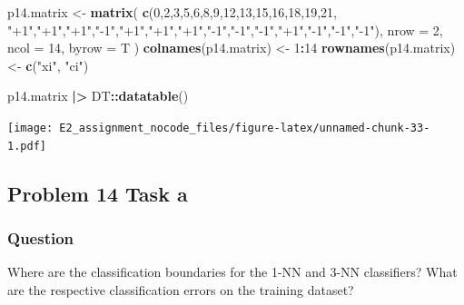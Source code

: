 \documentclass[
]{article}
\newenvironment{Shaded}{\begin{snugshade}}{\end{snugshade}}
\newcommand{\AttributeTok}[1]{\textcolor[rgb]{0.13,0.29,0.53}{#1}}
\newcommand{\DecValTok}[1]{\textcolor[rgb]{0.00,0.00,0.81}{#1}}
\newcommand{\FunctionTok}[1]{\textcolor[rgb]{0.13,0.29,0.53}{\textbf{#1}}}
\newcommand{\NormalTok}[1]{#1}
\newcommand{\OtherTok}[1]{\textcolor[rgb]{0.56,0.35,0.01}{#1}}
\newcommand{\SpecialCharTok}[1]{\textcolor[rgb]{0.81,0.36,0.00}{\textbf{#1}}}
\newcommand{\StringTok}[1]{\textcolor[rgb]{0.31,0.60,0.02}{#1}}
\begin{document}
\begin{Shaded}
\begin{Highlighting}[]
\NormalTok{p14.matrix }\OtherTok{\textless{}{-}} 
  \FunctionTok{matrix}\NormalTok{(}
    \FunctionTok{c}\NormalTok{(}\DecValTok{0}\NormalTok{,}\DecValTok{2}\NormalTok{,}\DecValTok{3}\NormalTok{,}\DecValTok{5}\NormalTok{,}\DecValTok{6}\NormalTok{,}\DecValTok{8}\NormalTok{,}\DecValTok{9}\NormalTok{,}\DecValTok{12}\NormalTok{,}\DecValTok{13}\NormalTok{,}\DecValTok{15}\NormalTok{,}\DecValTok{16}\NormalTok{,}\DecValTok{18}\NormalTok{,}\DecValTok{19}\NormalTok{,}\DecValTok{21}\NormalTok{, }\StringTok{"+1"}\NormalTok{,}\StringTok{"+1"}\NormalTok{,}\StringTok{"+1"}\NormalTok{,}\StringTok{"{-}1"}\NormalTok{,}\StringTok{"+1"}\NormalTok{,}\StringTok{"+1"}\NormalTok{,}\StringTok{"+1"}\NormalTok{,}\StringTok{"{-}1"}\NormalTok{,}\StringTok{"{-}1"}\NormalTok{,}\StringTok{"{-}1"}\NormalTok{,}\StringTok{"+1"}\NormalTok{,}\StringTok{"{-}1"}\NormalTok{,}\StringTok{"{-}1"}\NormalTok{,}\StringTok{"{-}1"}\NormalTok{),}
    \AttributeTok{nrow =} \DecValTok{2}\NormalTok{, }\AttributeTok{ncol =} \DecValTok{14}\NormalTok{, }\AttributeTok{byrow =}\NormalTok{  T}
\NormalTok{  )}
\FunctionTok{colnames}\NormalTok{(p14.matrix) }\OtherTok{\textless{}{-}} \DecValTok{1}\SpecialCharTok{:}\DecValTok{14}
\FunctionTok{rownames}\NormalTok{(p14.matrix) }\OtherTok{\textless{}{-}} \FunctionTok{c}\NormalTok{(}\StringTok{"xi"}\NormalTok{, }\StringTok{"ci"}\NormalTok{)}

\NormalTok{p14.matrix }\SpecialCharTok{|\textgreater{}}\NormalTok{ DT}\SpecialCharTok{::}\FunctionTok{datatable}\NormalTok{()}
\end{Highlighting}
\end{Shaded}

\texttt{[image: E2\_assignment\_nocode\_files/figure-latex/unnamed-chunk-33-1.pdf]}

\hypertarget{problem-14-task-a}{%
\subsection{Problem 14 Task a}\label{problem-14-task-a}}

\hypertarget{question-11}{%
\subsubsection{Question}\label{question-11}}

Where are the classification boundaries for the 1-NN and 3-NN
classifiers? What are the respective classification errors on the
training dataset?
\end{document}
